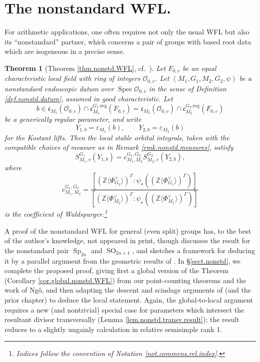 \documentclass[openany]{amsbook}
\newtheorem{theorem}{Theorem}[chapter]
\theoremstyle{definition}
\theoremstyle{remark}
\numberwithin{equation}{section}
\newcommand{\Z}{\mathbb{Z}}
\renewcommand{\O}{\mathcal{O}}
\renewcommand{\epsilon}{\varepsilon}
\renewcommand{\-}{\operatorname{-}}
\newcommand{\Spec}{\operatorname{Spec}}
\newcommand{\on}[1]{\operatorname{#1}}
\newcommand{\Sp}{\on{Sp}}
\newcommand{\fc}{\mathfrak{c}}
\begin{document}
\section{The nonstandard WFL.}



For arithmetic applications, one often requires not only the usual WFL but also its ``nonstandard'' partner, which concerns a pair of groups with based root data which are isogeneous in a precise sense.

\begin{theorem}[{Theorem \ref{thm.nonstd.WFL}, cf.\ \cite[Conjecture 3.7]{WaldTordu}}]
    Let $F_{0,v}$ be an equal characteristic local field with ring of integers $\O_{0,v}$. Let $(M_1, G_1, M_2, G_2, \psi)$ be a nonstandard endoscopic datum over $\Spec \O_{0,v}$ in the sense of Definition \ref{def.nonstd.datum}, assumed in good characteristic. Let $$b \in \fc_{M_1}(\O_{0,v}) \cap \fc_{M_1}^{G_1\text{-reg}}(F_{0,v}) = \fc_{M_2}(\O_{0,v}) \cap \fc_{M_2}^{G_2\text{-reg}}(F_{0,v})$$ be a generically regular parameter, and write
    $$
        Y_{1,b} = \epsilon_{M_1}(b), \qquad Y_{2,b} = \epsilon_{M_2}(b)
    $$
    for the Kostant lifts. Then the local stable orbital integrals, taken with the compatible choices of measure as in Remark \ref{rmk.nonstd.measures}, satisfy
    $$
        S_{M_1, v}^{G_1}(Y_{1,b}) = c_{M_1, M_2}^{G_1, G_2} S_{M_2, v}^{G_2}(Y_{2,b}),
    $$
    where 
    $$
        c_{M_1, M_2}^{G_1, G_2} = \frac{[(\Z \langle \Phi_{G_2}^\vee \rangle)^{\Gamma} : \psi_\star((\Z \langle \Phi_{G_1}^\vee \rangle)^{\Gamma})]}{[(\Z \langle \Phi_{M_2}^\vee \rangle)^{\Gamma} : \psi_\star((\Z \langle \Phi_{M_1}^\vee \rangle)^{\Gamma})]}
    $$
    is the coefficient of Waldspurger.\footnote{Indices follow the convention of Notation \ref{not.commens.rel.index}.}
\end{theorem}

A proof of the nonstandard WFL for general (even split) groups has, to the best of the author's knowledge, not appeared in print, though \cite{Chaudouardnonstandardexample} discusses the result for the nonstandard pair $\Sp_{2n}$ and $\on{SO}_{2n+1}$, and sketches a framework for deducing it by a parallel argument from the geometric results of \cite{CLII}. In \S \ref{sect.nonstd}, we complete the proposed proof, giving first a global version of the Theorem (Corollary \ref{cor.global.nonstd.WFL}) from our point-counting theorems and the work of Ng\^{o}, and then adapting the descent and scindage arguments of \cite[\S 16-18]{CLII} (and the prior chapter) to deduce the local statement. Again, the global-to-local argument requires a new (and nontrivial) special case for parameters which intersect the resultant divisor transversally (Lemma \ref{lem.nonstd.transv.result}); the result reduces to a slightly ungainly calculation in relative semisimple rank 1.
\end{document}
